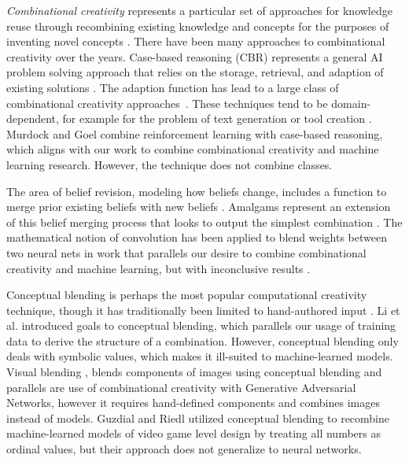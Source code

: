 \documentclass[letterpaper]{article}
\begin{document}
\textit{Combinational creativity} represents a particular set of approaches for knowledge reuse through recombining existing knowledge and concepts for the purposes of inventing novel concepts \cite{boden2004creative}. There have been many approaches to combinational creativity over the years. Case-based reasoning (CBR) represents a general AI problem solving approach that relies on the storage, retrieval, and adaption of existing solutions \cite{de2005retrieval}. The adaption function has lead to a large class of combinational creativity approaches~\cite{wilke1998techniques,fox2009exploring,manzano2011amalgam}. These techniques tend to be domain-dependent, for example for the problem of text generation or tool creation \cite{hervas2006case,sizov2015evidence}. Murdock and Goel  combine reinforcement learning with case-based reasoning, which aligns with our work to combine combinational creativity and machine learning research. However, the technique does not combine classes.

The area of belief revision, modeling how beliefs change, includes a function to merge prior existing beliefs with new beliefs \cite{cojan2009belief,konieczny2011logic,fox2009exploring}. Amalgams represent an extension of this belief merging process that looks to output the simplest combination \cite{ontanon2010amalgams}. The mathematical notion of convolution has been applied to blend weights between two neural nets in work that parallels our desire to combine combinational creativity and machine learning, but with inconclusive results \cite{thagard2011aha}. 

Conceptual blending is perhaps the most popular computational creativity technique, though it has traditionally been limited to hand-authored input \cite{fauconnier2001conceptual}. Li et al.  introduced goals to conceptual blending, which parallels our usage of training data to derive the structure of a combination. However, conceptual blending only deals with symbolic values, which makes it ill-suited to machine-learned models. Visual blending \cite{cunha2017pig}, blends components of images using conceptual blending and parallels are use of combinational creativity with Generative Adversarial Networks, however it requires hand-defined components and combines images instead of models. Guzdial and Riedl  utilized conceptual blending to recombine machine-learned models of video game level design by treating all numbers as ordinal values, but their approach does not generalize to neural networks.
\end{document}
